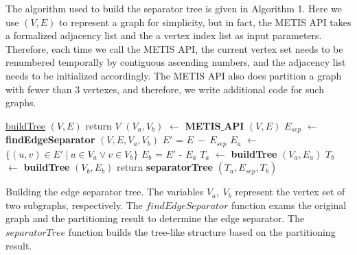 \documentclass[12pt,glossary]{dalthesis}
\begin{document}
\bigskip
\bigskip

The algorithm used to build the separator tree is given in Algorithm 1. Here we use $(V,E)$
to represent a graph for simplicity, but in fact, the METIS API takes a formalized adjacency list and the a vertex index list as input parameters. Therefore, each time we call the METIS API, the current vertex set needs to be renumbered temporally by contiguous ascending numbers, and the adjacency list needs to be initialized accordingly. The METIS API also does partition a graph with fewer than 3 vertexes, and therefore, we write additional code for such graphs.

\bigskip

\begin{algorithm}
    \underline{buildTree} $(V,E)$\;
      {
        return $V$\;
      }
      {
      	$(V_{a},V_{b})$ $\leftarrow$ \textbf{METIS$\_$API} $(V,E)$  \;
		$E_{sep}$ $\leftarrow$ \textbf{findEdgeSeparator} $(V,E,V_{a},V_{b})$ \;
		$E'$ = $E \  - \ E_{sep}$   \;
      	$E_{a}$ $\leftarrow$ $\{ (u,v) \in E' \ | \  u\in V_{a} \vee v \in V_{b} \}$ \;
		$E_{b}$ = $E'$ - $E_{a}$ \;
		$T_{a}$ $\leftarrow$ \textbf{buildTree} $(V_{a},E_{a})$ \;
		$T_{b}$ $\leftarrow$ \textbf{buildTree} $(V_{b},E_{b})$ \;  
        return \textbf{separatorTree} $(T_{a}, E_{sep}, T_{b})$ \; 
      }
    \caption{Building the edge separator tree. The variables $V_{a},\ V_{b}$ represent the vertex set of two subgraphs, respectively. The $findEdgeSeparator$ function exams the original graph and the partitioning result to determine the edge separator. The $separatorTree$ function builds the tree-like structure based on the partitioning result.}
\end{algorithm}
\bigskip
\end{document}
